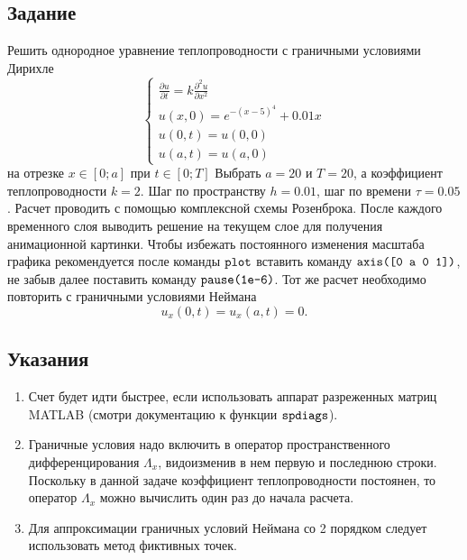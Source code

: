 \chapter{}

\section{Задание}
Решить однородное уравнение теплопроводности с граничными условиями Дирихле 
\begin{equation} \label{c9eq1}
	\begin{cases}
		\displaystyle \frac{\partial u}{\partial t} = k \frac{\partial^2 u}{\partial x^2} \\
		\displaystyle u(x,0) = e^{-(x-5)^4} + 0.01x \\
		u(0,t) = u(0,0) \\  
		u(a,t) = u(a,0)
	\end{cases}
\end{equation}
на отрезке $x \in [0; a]$ при $t \in [0; T]$ Выбрать $a = 20$ и $T = 20$, а коэффициент теплопроводности $k = 2$. Шаг по пространству $h = 0.01$, шаг по времени $\tau = 0.05$. Расчет проводить с помощью комплексной схемы Розенброка. После каждого временного слоя выводить решение на текущем слое для получения анимационной картинки. Чтобы избежать постоянного изменения масштаба графика рекомендуется после команды $\texttt{\lstinline|plot|}$ вставить команду $\texttt{\lstinline|axis([0 a 0 1])|}$, не забыв далее поставить команду $\texttt{\lstinline|pause(1e-6)|}$.
Тот же расчет необходимо повторить с граничными условиями Неймана
\begin{equation} \label{c9eq2}
	u_x(0,t) = u_x(a,t) = 0.
\end{equation}

\section{Указания}
\begin{enumerate}
\item Счет будет идти быстрее, если использовать аппарат разреженных матриц MATLAB (смотри документацию к функции $\texttt{\lstinline|spdiags|}$).
\item Граничные условия надо включить в оператор пространственного дифференцирования $\Lambda_x$, видоизменив в нем первую и последнюю строки. Поскольку в данной задаче коэффициент теплопроводности постоянен, то оператор $\Lambda_x$ можно вычислить один раз до начала расчета.
\item Для аппроксимации граничных условий Неймана со 2 порядком следует использовать метод фиктивных точек.
\end{enumerate}


